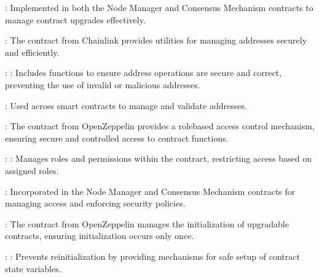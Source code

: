 \documentclass[a4paper,10pt,english]{sphinxmanual}
\let\sphinxpxdimen\pdfpxdimen\else\newdimen\sphinxpxdimen
\begin{document}
\sphinxAtStartPar
{}:
Implemented in both the Node Manager and Consensus Mechanism contracts to manage contract upgrades effectively.

\noindent{\hspace*{\fill}\sphinxincludegraphics[width=600\sphinxpxdimen]{{proxy-contract}.png}\hspace*{\fill}}

\sphinxAtStartPar
{}

\sphinxAtStartPar
{}:
The  contract from Chainlink provides utilities for managing addresses securely and efficiently.

\sphinxAtStartPar
{}:
\sphinxhyphen{} : Includes functions to ensure address operations are secure and correct, preventing the use of invalid or malicious addresses.

\sphinxAtStartPar
{}:
Used across smart contracts to manage and validate addresses.

\sphinxAtStartPar
{}

\sphinxAtStartPar
{}:
The  contract from OpenZeppelin provides a role\sphinxhyphen{}based access control mechanism, ensuring secure and controlled access to contract functions.

\sphinxAtStartPar
{}:
\sphinxhyphen{} : Manages roles and permissions within the contract, restricting access based on assigned roles.

\sphinxAtStartPar
{}:
Incorporated in the Node Manager and Consensus Mechanism contracts for managing access and enforcing security policies.

\sphinxAtStartPar
{}

\sphinxAtStartPar
{}:
The  contract from OpenZeppelin manages the initialization of upgradable contracts, ensuring initialization occurs only once.

\sphinxAtStartPar
{}:
\sphinxhyphen{} : Prevents reinitialization by providing mechanisms for safe setup of contract state variables.
\end{document}
